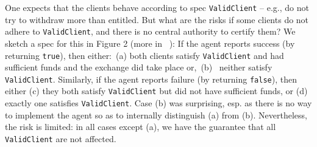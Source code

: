 \documentclass[11pt]{article}
\newcommand{\prg}[1]{{\mbox{{{\tt #1}}}}}%
\begin{document}
\begin{multicols}{2}
One expects that the clients behave according to  spec \prg{ValidClient} --
e.g., do not try to withdraw more than entitled.
But what are the risks if some clients do not adhere to  \prg{ValidClient}, and there 
 is no central authority to certify them?
We sketch a spec for this  %
in Figure 2 (more in ~\cite{swapsies}):  
If the agent reports success (by returning \prg{true}), then either:\ (a)  both clients 
  satisfy  \prg{ValidClient} and had sufficient funds and 
the exchange did take place
 or,\  (b) \ neither
  satisfy  \prg{ValidClient}. 
Similarly, if the agent reports failure (by returning \prg{false}), then either (c) they both satisfy  \prg{ValidClient}  but did not have
sufficient funds, or (d) exactly one satisfies \prg{ValidClient}. 
Case (b) was surprising, esp. as  there is no way to implement the agent so as to internally distinguish  (a) from (b).
Nevertheless, the risk is limited: in all cases except (a), we have the guarantee that all %
\prg{ValidClient}  %
are not affected.
  

\end{multicols}
\end{document}
